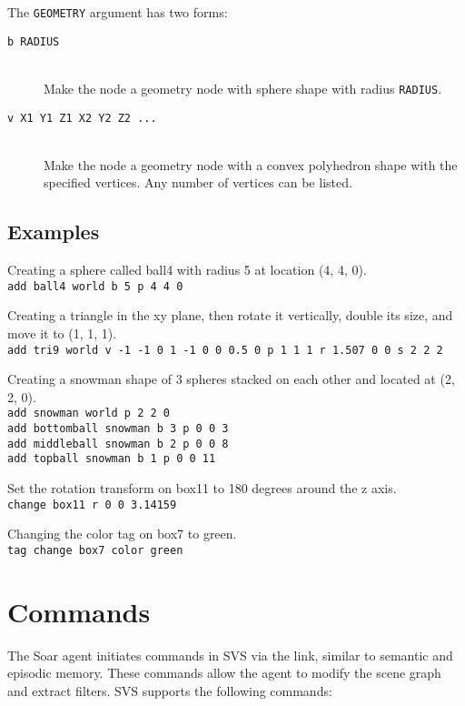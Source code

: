 The \texttt{GEOMETRY} argument has two forms:

\begin{description}

\item[\texttt{b RADIUS}] \hfill \\
Make the node a geometry node with sphere shape with radius \texttt{RADIUS}.

\item[\texttt{v X1 Y1 Z1 X2 Y2 Z2 ...}] \hfill \\
Make the node a geometry node with a convex polyhedron shape with the specified vertices.
Any number of vertices can be listed.

\end{description}

\subsection{Examples}

Creating a sphere called ball4 with radius 5 at location (4, 4, 0). \\
\texttt{add ball4 world b 5 p 4 4 0}

Creating a triangle in the xy plane, then rotate it vertically, double its size, and move it to (1, 1, 1).  \\
\texttt{add tri9 world v -1 -1 0 1 -1 0 0 0.5 0 p 1 1 1 r 1.507 0 0 s 2 2 2}

Creating a snowman shape of 3 spheres stacked on each other and located at (2, 2, 0). \\
\texttt{add snowman world p 2 2 0} \\
\texttt{add bottomball snowman b 3 p 0 0 3} \\
\texttt{add middleball snowman b 2 p 0 0 8} \\
\texttt{add topball snowman b 1 p 0 0 11} 

Set the rotation transform on box11 to 180 degrees around the z axis. \\
\texttt{change box11 r 0 0 3.14159}

Changing the color tag on box7 to green. \\
\texttt{tag change box7 color green}


\section{Commands}

The Soar agent initiates commands in SVS via the  link, 
similar to semantic and episodic memory. These commands allow the agent to 
modify the scene graph and extract filters. 
SVS supports the following commands:

